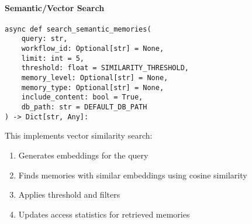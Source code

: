 \documentclass[12pt,a4paper]{article}
\begin{document}
\paragraph{Semantic/Vector Search}
\begin{pageablecode}
\begin{verbatim}
async def search_semantic_memories(
    query: str,
    workflow_id: Optional[str] = None,
    limit: int = 5,
    threshold: float = SIMILARITY_THRESHOLD,
    memory_level: Optional[str] = None,
    memory_type: Optional[str] = None,
    include_content: bool = True,
    db_path: str = DEFAULT_DB_PATH
) -> Dict[str, Any]:
\end{verbatim}
\end{pageablecode}
This implements vector similarity search:
\begin{enumerate}[label=\arabic*.]
    \item Generates embeddings for the query
    \item Finds memories with similar embeddings using cosine similarity
    \item Applies threshold and filters
    \item Updates access statistics for retrieved memories
\end{enumerate}
\end{document}
